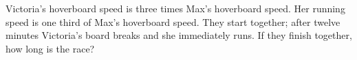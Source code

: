 Victoria's hoverboard speed is three times Max's hoverboard speed. Her running speed is one third of Max's hoverboard speed. They start together; after twelve minutes Victoria's board breaks and she immediately runs. If they finish together, how long is the race?
